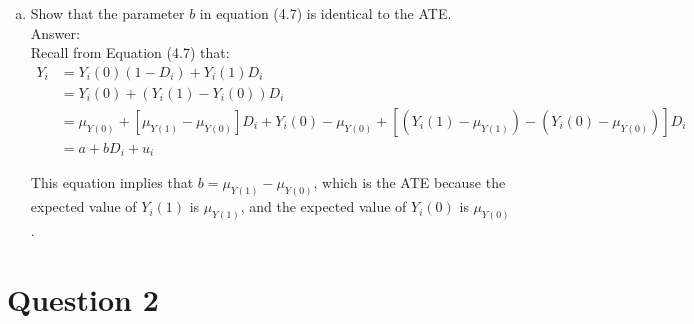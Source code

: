 \documentclass[11pt,notitlepage]{article}\usepackage[]{graphicx}\usepackage[]{color}
\makeatletter
\newenvironment{kframe}{%
 \def\at@end@of@kframe{}%
 \ifinner\ifhmode%
  \def\at@end@of@kframe{\end{minipage}}%
  \begin{minipage}{\columnwidth}%
 \fi\fi%
 \def\FrameCommand##1{\hskip\@totalleftmargin \hskip-\fboxsep
 \colorbox{shadecolor}{##1}\hskip-\fboxsep
     \hskip-\linewidth \hskip-\@totalleftmargin \hskip\columnwidth}%
 \MakeFramed {\advance\hsize-\width
   \@totalleftmargin\z@ \linewidth\hsize
   \@setminipage}}%
 {\par\unskip\endMakeFramed%
 \at@end@of@kframe}
\newenvironment{knitrout}{}{} %
\makeatother
\begin{document}
\begin{enumerate}[a)]
\item Show that the parameter $b$ in equation (4.7) is identical to the ATE.\\
Answer:\\
Recall from Equation (4.7) that:
\begin{align*}
Y_i & =Y_i (0)(1-D_i )+Y_i (1) D_i\\
&=Y_i (0)+(Y_i (1)-Y_i (0) )D_i\\
&= \mu_{Y(0)}+[\mu_{Y(1)}-\mu_{Y(0)} ] D_i+Y_i (0)-\mu_{Y(0)}+[(Y_i (1)-\mu_{Y(1)} )-(Y_i (0)-\mu_{Y(0)} )] D_i\\
&= a+bD_i+u_i
\end{align*}

This equation implies that $b=\mu_{Y(1)}-\mu_{Y(0)}$, which is the ATE because the expected value of $Y_i (1)$ is $\mu_{Y(1)}$, and the expected value of $Y_i (0)$ is $\mu_{Y(0)}$.

\end{enumerate}

\section*{Question 2}

\begin{knitrout}
\color{fgcolor}\begin{kframe}
\begin{verbatim}





\end{verbatim}
\end{kframe}
\end{knitrout}
\end{document}
